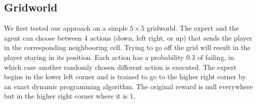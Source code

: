 \documentclass{llncs}
\newcommand{\0}{\mathbf{0}}
\newcommand{\1}{\mathbf{1}}
\begin{document}
\subsection{Gridworld}
We first tested our approach on a simple $5\times 5$ gridworld. The expert and the agent can choose between 4 actions (down, left right, or up) that sends the player in the corresponding neighbooring cell. Trying to go off the grid will result in the player staying in its position. Each action has a probability $0.3$ of failing, in which case another randomly chosen different action is executed. The expert begins in the lower left corner and is trained to go to the higher right corner by an exact dynamic programming algorithm. The original reward is null everywhere but in the higher right corner where it is $1$.\\
\end{document}
